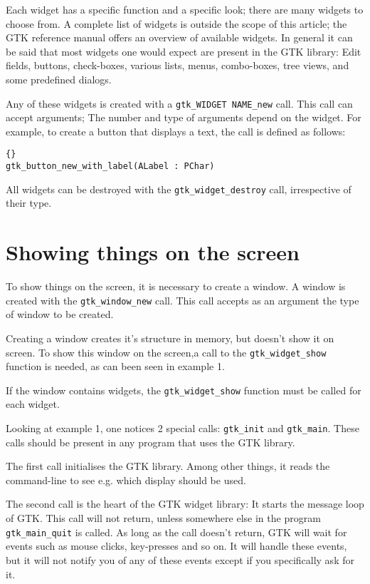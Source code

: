 \documentclass[10pt]{article}
\begin{document}
Each widget has a specific function and a specific look; there are many
widgets to choose from. A complete list of widgets is outside the scope of
this article; the GTK reference manual offers an overview of available
widgets. In general it can be said that most widgets one would expect
are present in the GTK library: Edit fields, buttons, check-boxes, various 
lists, menus, combo-boxes, tree views, and some predefined dialogs. 

Any of these widgets is created with a \lstinline|gtk_WIDGET NAME_new| call. 
This call can accept arguments; The number and type of arguments depend 
on the widget. 
For example, to create a button that displays a text, the call is defined 
as follows:
\begin{lstlisting}{}
gtk_button_new_with_label(ALabel : PChar)
\end{lstlisting}
All widgets can be destroyed with the \lstinline|gtk_widget_destroy| call,
irrespective of their type.

\section{Showing things on the screen}
To show things on the screen, it is necessary to create a window. A window
is created with the \lstinline|gtk_window_new| call. This call accepts 
as an argument the type of window to be created. 

Creating a window creates it's structure in memory, but doesn't show it on 
screen. To show this window on the screen,a call to the 
\lstinline|gtk_widget_show| function is needed, as can been seen in
example 1.

If the window contains widgets, the \lstinline|gtk_widget_show| function
must be called for each widget. 

Looking at example 1, one notices 2 special calls: \lstinline|gtk_init| and
\lstinline|gtk_main|. These calls should be present in any program that uses
the GTK library.  

The first call initialises the GTK library. Among other things, it reads
the command-line to see e.g. which display should be used.

The second call is the heart of the GTK widget library: It starts the
message loop of GTK. This call will not return, unless somewhere else
in the program \lstinline|gtk_main_quit| is called. As long as the call
doesn't return, GTK will wait for events such as mouse clicks, key-presses
and so on. It will handle these events, but it will not notify you of any 
of these events except if you specifically ask for it. 
\end{document}
